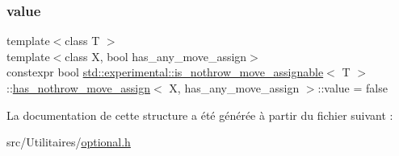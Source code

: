 \subsubsection{\texorpdfstring{value}{value}}
{\footnotesize\ttfamily template$<$class T $>$ \\
template$<$class X, bool has\+\_\+any\+\_\+move\+\_\+assign$>$ \\
constexpr bool \hyperlink{structstd_1_1experimental_1_1is__nothrow__move__assignable}{std\+::experimental\+::is\+\_\+nothrow\+\_\+move\+\_\+assignable}$<$ T $>$\+::\hyperlink{structstd_1_1experimental_1_1is__nothrow__move__assignable_1_1has__nothrow__move__assign}{has\+\_\+nothrow\+\_\+move\+\_\+assign}$<$ X, has\+\_\+any\+\_\+move\+\_\+assign $>$\+::value = false\hspace{0.3cm}{\ttfamily [static]}}



La documentation de cette structure a été générée à partir du fichier suivant \+:\begin{DoxyCompactItemize}
\item 
src/\+Utilitaires/\hyperlink{optional_8h}{optional.\+h}\end{DoxyCompactItemize}
